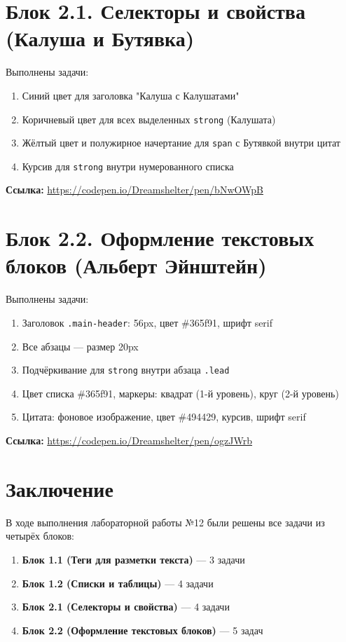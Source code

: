 \documentclass[a4paper,14pt,oneside,openany]{memoir}
\begin{document}
\vspace{15pt}

\section{Блок 2.1. Селекторы и свойства (Калуша и Бутявка)}

Выполнены задачи:
\begin{enumerate}
    \item Синий цвет для заголовка "Калуша с Калушатами"
    \item Коричневый цвет для всех выделенных \texttt{strong} (Калушата)
    \item Жёлтый цвет и полужирное начертание для \texttt{span} с Бутявкой внутри цитат
    \item Курсив для \texttt{strong} внутри нумерованного списка
\end{enumerate}

\textbf{Ссылка:} \href{https://codepen.io/Dreamshelter/pen/bNwOWpB}{https://codepen.io/Dreamshelter/pen/bNwOWpB}

\vspace{15pt}

\section{Блок 2.2. Оформление текстовых блоков (Альберт Эйнштейн)}

Выполнены задачи:
\begin{enumerate}
    \item Заголовок \texttt{.main-header}: 56px, цвет \#365f91, шрифт serif
    \item Все абзацы — размер 20px
    \item Подчёркивание для \texttt{strong} внутри абзаца \texttt{.lead}
    \item Цвет списка \#365f91, маркеры: квадрат (1-й уровень), круг (2-й уровень)
    \item Цитата: фоновое изображение, цвет \#494429, курсив, шрифт serif
\end{enumerate}

\textbf{Ссылка:} \href{https://codepen.io/Dreamshelter/pen/ogzJWrb}{https://codepen.io/Dreamshelter/pen/ogzJWrb}

\section*{Заключение}

В ходе выполнения лабораторной работы №12 были решены все задачи из четырёх блоков:

\begin{enumerate}
    \item \textbf{Блок 1.1 (Теги для разметки текста)} — 3 задачи
    \item \textbf{Блок 1.2 (Списки и таблицы)} — 4 задачи
    \item \textbf{Блок 2.1 (Селекторы и свойства)} — 4 задачи
    \item \textbf{Блок 2.2 (Оформление текстовых блоков)} — 5 задач
\end{enumerate}
\end{document}
